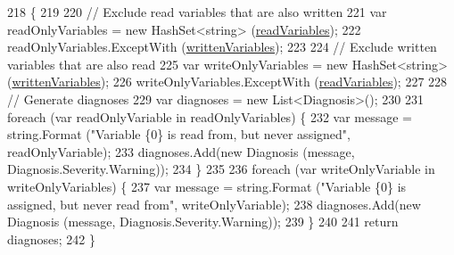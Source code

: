 \begin{DoxyCode}
218         \{
219 
220             \textcolor{comment}{// Exclude read variables that are also written}
221             var readOnlyVariables = \textcolor{keyword}{new} HashSet<string> (\hyperlink{a00159_a6b542092ddce1b92c9455d60899518a9}{readVariables});
222             readOnlyVariables.ExceptWith (\hyperlink{a00159_a0c2fe6eded1b10b135ca2469f5980a39}{writtenVariables});
223 
224             \textcolor{comment}{// Exclude written variables that are also read}
225             var writeOnlyVariables = \textcolor{keyword}{new} HashSet<string> (\hyperlink{a00159_a0c2fe6eded1b10b135ca2469f5980a39}{writtenVariables});
226             writeOnlyVariables.ExceptWith (\hyperlink{a00159_a6b542092ddce1b92c9455d60899518a9}{readVariables});
227 
228             \textcolor{comment}{// Generate diagnoses}
229             var diagnoses = \textcolor{keyword}{new} List<Diagnosis>();
230 
231             \textcolor{keywordflow}{foreach} (var readOnlyVariable \textcolor{keywordflow}{in} readOnlyVariables) \{
232                 var message = string.Format (\textcolor{stringliteral}{"Variable \{0\} is read from, but never assigned"}, 
      readOnlyVariable);
233                 diagnoses.Add(\textcolor{keyword}{new} Diagnosis (message, Diagnosis.Severity.Warning));
234             \}
235 
236             \textcolor{keywordflow}{foreach} (var writeOnlyVariable \textcolor{keywordflow}{in} writeOnlyVariables) \{
237                 var message = string.Format (\textcolor{stringliteral}{"Variable \{0\} is assigned, but never read from"}, 
      writeOnlyVariable);
238                 diagnoses.Add(\textcolor{keyword}{new} Diagnosis (message, Diagnosis.Severity.Warning));
239             \}
240 
241             \textcolor{keywordflow}{return} diagnoses;
242         \}
\end{DoxyCode}


